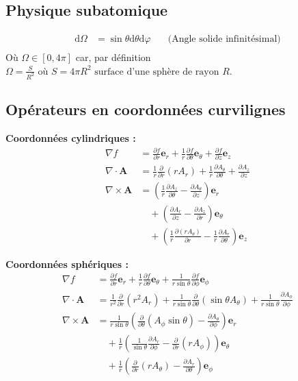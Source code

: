 \documentclass[a4paper,10pt]{report}
\begin{document}
	\subsection{Physique subatomique}\label{subsubsec:subatomique}
	\begin{align*}
		\text{d}\Omega &= \sin\theta \text{d}\theta \text{d}\varphi\quad & \text{(Angle solide infinitésimal)}\\
	\end{align*}
		Où $\Omega \in [0, 4\pi]$ car, par définition $\Omega = \frac {S}{R^2}\text{ où } S = 4\pi R^2 \text{ surface d'une sphère de rayon } R$.
		\subsection{Opérateurs en coordonnées curvilignes}\label{subsubsec:operateurs}
	\textbf{Coordonnées cylindriques :}
	\begin{align*}
		\nabla f &= \frac{\partial f}{\partial r} \mathbf{e}_r + \frac{1}{r} \frac{\partial f}{\partial \theta} \mathbf{e}_\theta + \frac{\partial f}{\partial z} \mathbf{e}_z \\
		\nabla \cdot \mathbf{A} &= \frac{1}{r} \frac{\partial}{\partial r} (r A_r) + \frac{1}{r} \frac{\partial A_\theta}{\partial \theta} + \frac{\partial A_z}{\partial z} \\
		\nabla \times \mathbf{A} &= \left( \frac{1}{r} \frac{\partial A_z}{\partial \theta} - \frac{\partial A_\theta}{\partial z} \right) \mathbf{e}_r \\
		&\quad + \left( \frac{\partial A_r}{\partial z} - \frac{\partial A_z}{\partial r} \right) \mathbf{e}_\theta \\
		&\quad + \left( \frac{1}{r} \frac{\partial (r A_\theta)}{\partial r} - \frac{1}{r} \frac{\partial A_r}{\partial \theta} \right) \mathbf{e}_z
	\end{align*}
	
	\textbf{Coordonnées sphériques :}
	\begin{align*}
		\nabla f &= \frac{\partial f}{\partial r} \mathbf{e}_r + \frac{1}{r} \frac{\partial f}{\partial \theta} \mathbf{e}_\theta + \frac{1}{r \sin\theta} \frac{\partial f}{\partial \phi} \mathbf{e}_\phi \\
		\nabla \cdot \mathbf{A} &= \frac{1}{r^2} \frac{\partial}{\partial r} (r^2 A_r) + \frac{1}{r \sin\theta} \frac{\partial}{\partial \theta} (\sin\theta A_\theta) + \frac{1}{r \sin\theta} \frac{\partial A_\phi}{\partial \phi} \\
		\nabla \times \mathbf{A} &= \frac{1}{r \sin\theta} \left( \frac{\partial}{\partial \theta} (A_\phi \sin\theta) - \frac{\partial A_\theta}{\partial \phi} \right) \mathbf{e}_r \\
		&\quad + \frac{1}{r} \left( \frac{1}{\sin\theta} \frac{\partial A_r}{\partial \phi} - \frac{\partial}{\partial r} (r A_\phi) \right) \mathbf{e}_\theta \\
		&\quad + \frac{1}{r} \left( \frac{\partial}{\partial r} (r A_\theta) - \frac{\partial A_r}{\partial \theta} \right) \mathbf{e}_\phi
	\end{align*}
	
\end{document}
